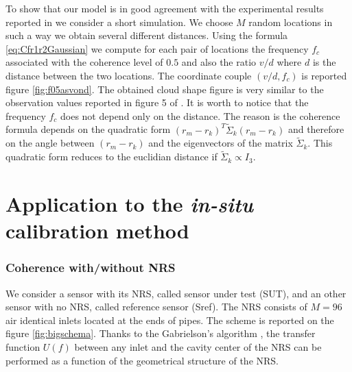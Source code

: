 To show that our model is in good agreement with the experimental results reported in  \cite{alcoverro:2005} we  consider a short simulation. We choose $M$ random locations in such a way we obtain several different distances. Using the formula \eqref{eq:Cfr1r2Gaussian} we compute for each pair of locations the frequency $f_{c}$ associated with the coherence level of $0.5$ and also the ratio $v/d$ where $d$ is the distance between the two locations. The coordinate couple $(v/d,f_{c})$ is reported figure \ref{fig:f05asvond}. The obtained cloud shape figure is very similar to the observation values reported in
figure 5 of \cite{alcoverro:2005}. It is worth to notice that the frequency $f_{c}$ does not depend only on the distance. The reason is the coherence formula depends on the quadratic form $(r_m-r_k)^{T}\tilde \Sigma_{k}(r_m-r_k)$ and therefore on the angle between $(r_m-r_k)$ and the  eigenvectors of the matrix  $\tilde \Sigma_{k}$. This quadratic form reduces to the euclidian distance if $\tilde \Sigma_{k}\propto I_{3}$.



 \newpage
 \section{Application to the {\it in-situ} calibration method}
 \subsubsection{Coherence with/without NRS}



	We consider a sensor with its NRS, called sensor under test (SUT), and an other sensor with no NRS, called reference sensor (Sref). The NRS consists  of $M=96$ air identical inlets located at the ends of pipes. The scheme is reported on the figure \ref{fig:bigschema}. Thanks to the  Gabrielson's algorithm \cite{gabrielson:2011}, the transfer function $U(f)$ between any inlet and the cavity center of the NRS can be performed as a function of the geometrical structure of the NRS.

